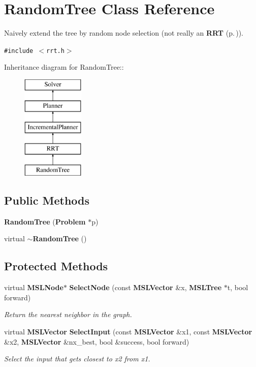 \section{Random\-Tree  Class Reference}
\label{classRandomTree}
Naively extend the tree by random node selection (not really an {\bf RRT} {\rm (p.\,\pageref{classRRT})}). 


{\tt \#include $<$rrt.h$>$}

Inheritance diagram for Random\-Tree::\begin{figure}[H]
\begin{center}
\leavevmode
\includegraphics[height=5cm]{classRandomTree}
\end{center}
\end{figure}
\subsection*{Public Methods}
\begin{CompactItemize}
\item 
{\bf Random\-Tree} ({\bf Problem} $\ast$p)
\item 
virtual {\bf $\sim$Random\-Tree} ()
\end{CompactItemize}
\subsection*{Protected Methods}
\begin{CompactItemize}
\item 
virtual {\bf MSLNode}$\ast$ {\bf Select\-Node} (const {\bf MSLVector} \&x, {\bf MSLTree} $\ast$t, bool forward)
\begin{CompactList}\small\item\em Return the nearest neighbor in the graph.\item\end{CompactList}\item 
virtual {\bf MSLVector} {\bf Select\-Input} (const {\bf MSLVector} \&x1, const {\bf MSLVector} \&x2, {\bf MSLVector} \&nx\_\-best, bool \&success, bool forward)
\begin{CompactList}\small\item\em Select the input that gets closest to x2 from x1.\item\end{CompactList}\end{CompactItemize}


